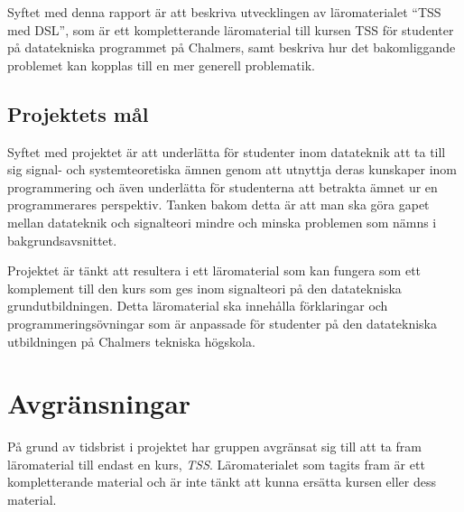 \documentclass[]{article}
\begin{document}

Syftet med denna rapport är att beskriva utvecklingen av läromaterialet
``TSS med DSL'', som är ett kompletterande läromaterial till kursen TSS
för studenter på datatekniska programmet på Chalmers,
samt beskriva hur det bakomliggande problemet kan kopplas till en mer
generell problematik.

\subsection{Projektets mål}
Syftet med projektet är att underlätta för studenter inom datateknik att
ta till sig signal- och systemteoretiska ämnen genom att utnyttja deras
kunskaper inom programmering och även underlätta för studenterna att betrakta
ämnet ur en programmerares perspektiv. Tanken bakom detta är att man ska göra
gapet mellan datateknik och signalteori mindre och minska problemen som nämns
i bakgrundsavsnittet.

Projektet är tänkt att resultera i ett läromaterial som kan fungera som ett
komplement till den kurs som ges inom signalteori på den datatekniska
grund\-utbildningen. Detta läromaterial ska innehålla förklaringar och
programmeringsövningar som är anpassade för studenter på den datatekniska
utbildningen på Chalmers tekniska högskola.

\section{Avgränsningar}

På grund av tidsbrist i projektet har gruppen avgränsat sig till att ta fram
läromaterial till endast en kurs, \textit{TSS}. Läromaterialet som tagits fram är ett
kompletterande material och är inte tänkt att kunna ersätta kursen eller
dess material.
\end{document}
